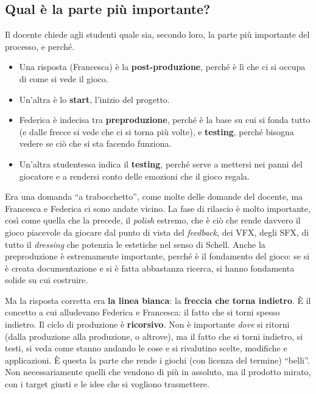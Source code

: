 \subsection{Qual è la parte più importante?}



Il docente chiede agli studenti quale sia, secondo loro, la parte più
importante del processo, e perché.
\begin{itemize}
  \item Una risposta (Francesca) è la \textbf{post-produzione}, perché è lì
        che ci si occupa di come si vede il gioco.
  \item Un'altra è lo \textbf{start}, l'inizio del progetto.
  \item Federica è indecisa tra \textbf{preproduzione}, perché è la base su
        cui si fonda tutto (e dalle frecce si vede che ci si torna più volte),
        e \textbf{testing}, perché bisogna vedere se ciò che si sta facendo
        funziona.
  \item Un'altra studentessa indica il \textbf{testing}, perché serve a
        mettersi nei panni del giocatore e a rendersi conto delle emozioni che
        il gioco regala.
\end{itemize}

Era una domanda ``a trabocchetto'', come molte delle domande del docente,
ma Francesca e Federica ci sono andate vicino. La fase di rilascio è molto
importante, così come quella che la precede, il \emph{polish} estremo, che è
ciò che rende davvero il gioco piacevole da giocare dal punto di vista del
\emph{feedback}, dei VFX, degli SFX, di tutto il \emph{dressing} che potenzia
le estetiche nel senso di Schell. Anche la preproduzione è estremamente
importante, perché è il fondamento del gioco: se si è creata documentazione e
si è fatta abbastanza ricerca, si hanno fondamenta solide su cui costruire.

Ma la risposta corretta era \textbf{la linea bianca}: la \textbf{freccia che
torna indietro}. È il concetto a cui alludevano Federica e Francesca: il fatto
che si torni spesso indietro. Il ciclo di produzione è \textbf{ricorsivo}. Non
è importante \emph{dove} si ritorni (dalla produzione alla produzione, o
altrove), ma il fatto che si torni indietro, si testi, si veda come stanno
andando le cose e si rivalutino scelte, modifiche e applicazioni. È questa la
parte che rende i giochi (con licenza del termine) ``belli''. Non
necessariamente quelli che vendono di più in assoluto, ma il prodotto mirato,
con i target giusti e le idee che si vogliono trasmettere.

